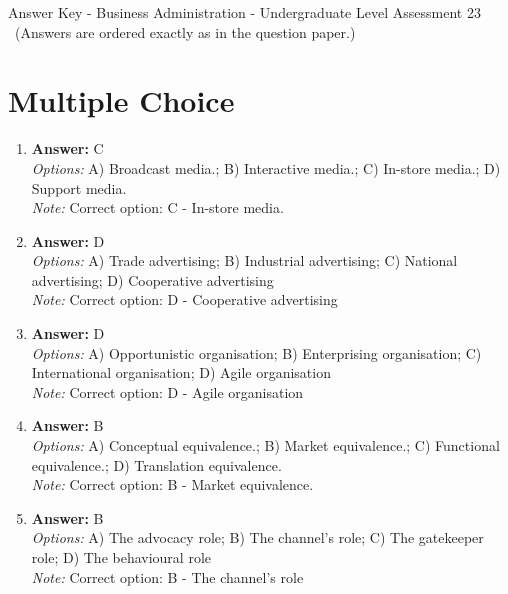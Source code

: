 \documentclass[12pt]{article}
\begin{document}
\begin{center}
Answer Key - Business Administration - Undergraduate Level Assessment 23 \
\small (Answers are ordered exactly as in the question paper.)
\end{center}

\section*{Multiple Choice}
\begin{enumerate}[label=\arabic*.]
\item \textbf{Answer:} C
\\ \textit{Options:} A) Broadcast media.; B) Interactive media.; C) In-store media.; D) Support media.
\\ \textit{Note:} Correct option: C - In-store media.
\item \textbf{Answer:} D
\\ \textit{Options:} A) Trade advertising; B) Industrial advertising; C) National advertising; D) Cooperative advertising
\\ \textit{Note:} Correct option: D - Cooperative advertising
\item \textbf{Answer:} D
\\ \textit{Options:} A) Opportunistic organisation; B) Enterprising organisation; C) International organisation; D) Agile organisation
\\ \textit{Note:} Correct option: D - Agile organisation
\item \textbf{Answer:} B
\\ \textit{Options:} A) Conceptual equivalence.; B) Market equivalence.; C) Functional equivalence.; D) Translation equivalence.
\\ \textit{Note:} Correct option: B - Market equivalence.
\item \textbf{Answer:} B
\\ \textit{Options:} A) The advocacy role; B) The channel's role; C) The gatekeeper role; D) The behavioural role
\\ \textit{Note:} Correct option: B - The channel's role
\end{enumerate}
\end{document}
